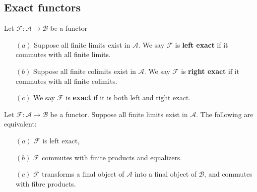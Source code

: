\subsection{Exact functors}
\begin{definition}
Let $\mathscr{F}:\mathcal{A}\to\mathcal{B}$ be a functor
\begin{itemize}
\item[$(a)$] Suppose all finite limits exist in $\mathcal{A}$. We say $\mathscr{F}$ is \textbf{left exact} if it commutes with all finite limits.
\item[$(b)$] Suppose all finite colimits exist in $\mathcal{A}$. We say $\mathscr{F}$ is \textbf{right exact} if it commutes with all finite colimits.
\item[$(c)$] We say $\mathscr{F}$ is \textbf{exact} if it is both left and right exact.
\end{itemize}
\end{definition}
\begin{proposition}
Let $\mathscr{F}:\mathcal{A}\to\mathcal{B}$ be a functor. Suppose all finite limits exist in $\mathcal{A}$. The following are equivalent:
\begin{itemize}
\item[$(a)$] $\mathscr{F}$ is left exact,
\item[$(b)$] $\mathscr{F}$ commutes with finite products and equalizers.
\item[$(c)$] $\mathscr{F}$ transforms a final object of $\mathcal{A}$ into a final object of $\mathcal{B}$, and commutes with fibre products.
\end{itemize}
\end{proposition}
